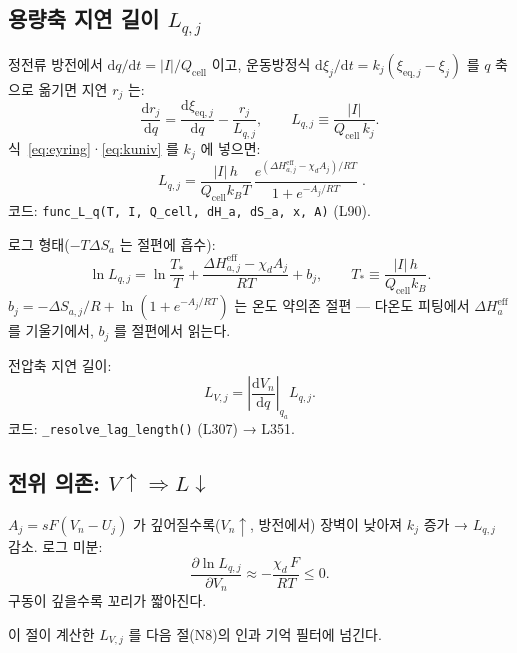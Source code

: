 \documentclass[11pt,a4paper]{article}
\newcommand{\dd}{\mathrm{d}}
\newcommand{\eq}{\mathrm{eq}}
\newcommand{\eff}{\mathrm{eff}}
\newcommand{\cell}{\mathrm{cell}}
\begin{document}
\subsection{용량축 지연 길이 $L_{q,j}$}

정전류 방전에서 $\dd q/\dd t = |I|/Q_\cell$ 이고, 운동방정식
$\dd\xi_j/\dd t = k_j(\xi_{\eq,j}-\xi_j)$ 를 $q$ 축으로 옮기면 지연 $r_j$ 는:
\begin{equation}
\frac{\dd r_j}{\dd q} = \frac{\dd\xi_{\eq,j}}{\dd q} - \frac{r_j}{L_{q,j}},\qquad
L_{q,j} \equiv \frac{|I|}{Q_\cell\,k_j}.
\label{eq:relaxq}
\end{equation}
식~\eqref{eq:eyring}·\eqref{eq:kuniv} 를 $k_j$ 에 넣으면:
\begin{equation}
\boxed{\;L_{q,j} = \frac{|I|\,h}{Q_\cell k_BT}\,
  \frac{e^{(\Delta H_{a,j}^\eff - \chi_d A_j)/RT}}{1 + e^{-A_j/RT}}\;.}
\label{eq:Lq}
\end{equation}
코드: \texttt{func\_L\_q(T, I, Q\_cell, dH\_a, dS\_a, x, A)} (L90).

로그 형태($-T\Delta S_a$ 는 절편에 흡수):
\begin{equation}
\ln L_{q,j} = \ln\frac{T_*}{T} + \frac{\Delta H_{a,j}^\eff - \chi_d A_j}{RT} + b_j,\qquad
T_* \equiv \frac{|I|\,h}{Q_\cell k_B}.
\label{eq:lnLq}
\end{equation}
$b_j = -\Delta S_{a,j}/R + \ln(1+e^{-A_j/RT})$ 는 온도 약의존 절편 — 다온도 피팅에서
$\Delta H_a^\eff$ 를 기울기에서, $b_j$ 를 절편에서 읽는다.

전압축 지연 길이:
\begin{equation}
L_{V,j} = \left|\frac{\dd V_n}{\dd q}\right|_{q_a}\!\! L_{q,j}.
\label{eq:LV}
\end{equation}
코드: \texttt{\_resolve\_lag\_length()} (L307) → L351.

\subsection{전위 의존: $V\uparrow\Rightarrow L\downarrow$}

$A_j = sF(V_n - U_j)$ 가 깊어질수록($V_n \uparrow$, 방전에서) 장벽이 낮아져
$k_j$ 증가 → $L_{q,j}$ 감소. 로그 미분:
\begin{equation}
\frac{\partial\ln L_{q,j}}{\partial V_n} \approx -\frac{\chi_d\,F}{RT} \le 0.
\label{eq:dLdV}
\end{equation}
구동이 깊을수록 꼬리가 짧아진다.

이 절이 계산한 $L_{V,j}$ 를 다음 절(N8)의 인과 기억 필터에 넘긴다.

\end{document}
